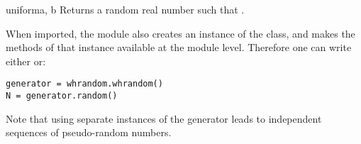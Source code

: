 \begin{funcdesc}{uniform}{a, b}
Returns a random real number  such that .
\end{funcdesc}

When imported, the  module also creates an instance of
the  class, and makes the methods of that instance
available at the module level.  Therefore one can write either 
 or:

\begin{verbatim}
generator = whrandom.whrandom()
N = generator.random()
\end{verbatim}

Note that using separate instances of the generator leads to
independent sequences of pseudo-random numbers.

\begin{seealso}
\end{seealso}
